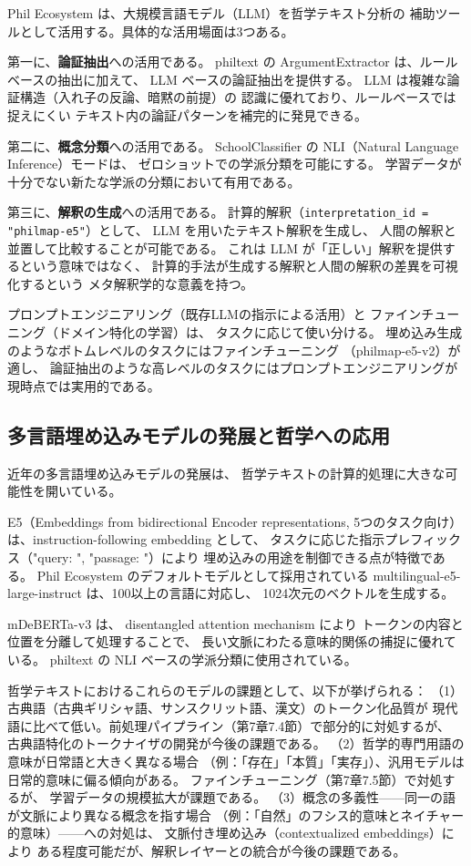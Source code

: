 \documentclass[a4paper,11pt]{ltjsarticle}
\begin{document}
Phil Ecosystem は、大規模言語モデル（LLM）を哲学テキスト分析の
補助ツールとして活用する。具体的な活用場面は3つある。

第一に、\textbf{論証抽出}への活用である。
philtext の ArgumentExtractor は、ルールベースの抽出に加えて、
LLM ベースの論証抽出を提供する。
LLM は複雑な論証構造（入れ子の反論、暗黙の前提）の
認識に優れており、ルールベースでは捉えにくい
テキスト内の論証パターンを補完的に発見できる。

第二に、\textbf{概念分類}への活用である。
SchoolClassifier の NLI（Natural Language Inference）モードは、
ゼロショットでの学派分類を可能にする。
学習データが十分でない新たな学派の分類において有用である。

第三に、\textbf{解釈の生成}への活用である。
計算的解釈（\texttt{interpretation\_id = "philmap-e5"}）として、
LLM を用いたテキスト解釈を生成し、
人間の解釈と並置して比較することが可能である。
これは LLM が「正しい」解釈を提供するという意味ではなく、
計算的手法が生成する解釈と人間の解釈の差異を可視化するという
メタ解釈学的な意義を持つ。

プロンプトエンジニアリング（既存LLMの指示による活用）と
ファインチューニング（ドメイン特化の学習）は、
タスクに応じて使い分ける。
埋め込み生成のようなボトムレベルのタスクにはファインチューニング
（philmap-e5-v2）が適し、
論証抽出のような高レベルのタスクにはプロンプトエンジニアリングが
現時点では実用的である。

\subsection{多言語埋め込みモデルの発展と哲学への応用}

近年の多言語埋め込みモデルの発展は、
哲学テキストの計算的処理に大きな可能性を開いている。

E5\cite{wang2022e5}（Embeddings from bidirectional Encoder representations,
5つのタスク向け）は、instruction-following embedding として、
タスクに応じた指示プレフィックス（"query: ", "passage: "）により
埋め込みの用途を制御できる点が特徴である。
Phil Ecosystem のデフォルトモデルとして採用されている
multilingual-e5-large-instruct は、100以上の言語に対応し、
1024次元のベクトルを生成する。

mDeBERTa-v3\cite{he2021deberta} は、
disentangled attention mechanism により
トークンの内容と位置を分離して処理することで、
長い文脈にわたる意味的関係の捕捉に優れている。
philtext の NLI ベースの学派分類に使用されている。

哲学テキストにおけるこれらのモデルの課題として、以下が挙げられる：
（1）古典語（古典ギリシャ語、サンスクリット語、漢文）のトークン化品質が
現代語に比べて低い。前処理パイプライン（第7章7.4節）で部分的に対処するが、
古典語特化のトークナイザの開発が今後の課題である。
（2）哲学的専門用語の意味が日常語と大きく異なる場合
（例：「存在」「本質」「実存」）、汎用モデルは日常的意味に偏る傾向がある。
ファインチューニング（第7章7.5節）で対処するが、
学習データの規模拡大が課題である。
（3）概念の多義性——同一の語が文脈により異なる概念を指す場合
（例：「自然」のフシス的意味とネイチャー的意味）——への対処は、
文脈付き埋め込み（contextualized embeddings）により
ある程度可能だが、解釈レイヤーとの統合が今後の課題である。
\end{document}
